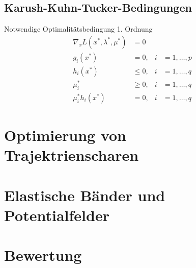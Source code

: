 		\subsection{Karush-Kuhn-Tucker-Bedingungen}
		Notwendige Optimalitätsbedingung 1. Ordnung %
\begin{align}
	\nabla_x L(x^\ast,\lambda^\ast,\mu^\ast) &= 0 \\
	g_i(x^\ast) &= 0, & i&=1,\ldots, p \\
	h_i(x^\ast) &\leq 0, & i&=1,\ldots, q \\
	\mu_i^\ast &\geq 0, & i&=1,\ldots, q \\
	\mu_i^\ast h_i(x^\ast) &= 0, & i&=1,\ldots, q
\end{align}		

	\section{Optimierung von Trajektrienscharen} 
	\section{Elastische Bänder und Potentialfelder} %
	
	\cite{koren1991potential} %
	\section{Bewertung}